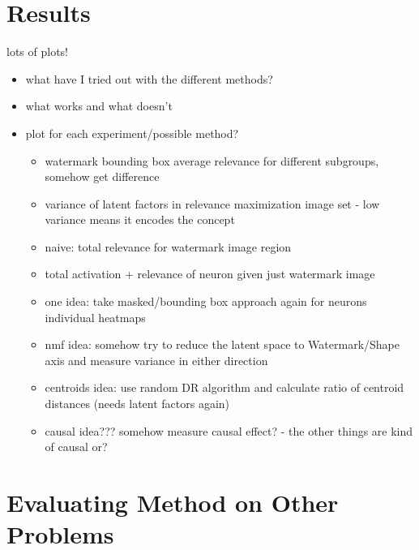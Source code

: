 \section{Results}
lots of plots!
\begin{itemize}
    \item what have I tried out with the different methods?
    \item what works and what doesn't
    \item plot for each experiment/possible method?
          \begin{itemize}
              \item watermark bounding box average relevance for different subgroups, somehow get difference
              \item variance of latent factors in relevance maximization image set - low variance means it encodes the concept
              \item naive: total relevance for watermark image region
              \item total activation + relevance of neuron given just watermark image
              \item one idea: take masked/bounding box approach again for neurons individual heatmaps
              \item nmf idea: somehow try to reduce the latent space to Watermark/Shape axis and measure variance in either direction
              \item centroids idea: use random DR algorithm and calculate ratio of centroid distances (needs latent factors again)
              \item causal idea??? somehow measure causal effect? - the other things are kind of causal or?
          \end{itemize}
\end{itemize}



\section{Evaluating Method on Other Problems}\label{section:further_problems}



